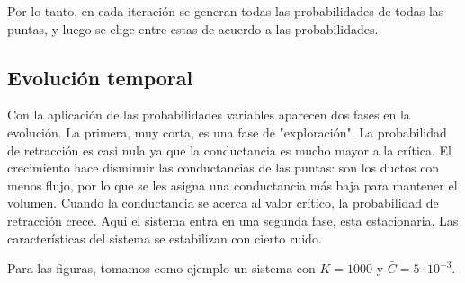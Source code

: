 \documentclass{article}
\begin{document}
Por lo tanto, en cada iteración se generan todas las probabilidades de todas las puntas, y luego se elige entre estas de acuerdo a las probabilidades.

\subsection{Evolución temporal}

Con la aplicación de las probabilidades variables aparecen dos fases en la evolución. La primera, muy corta, es una fase de "exploración".
La probabilidad de retracción es casi nula ya que la conductancia es mucho mayor a la crítica. El crecimiento hace disminuir las conductancias de las puntas:
son los ductos con menos flujo, por lo que se les asigna una conductancia más baja para mantener el volumen. Cuando la conductancia se acerca al valor crítico,
la probabilidad de retracción crece. Aquí el sistema entra en una segunda fase, esta estacionaria. Las características del sistema se estabilizan con cierto ruido.

Para las figuras, tomamos como ejemplo un sistema con $K = 1000$ y $\bar{C} = 5\cdot10^{-3}$.
\end{document}
